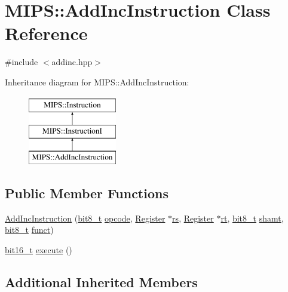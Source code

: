 \hypertarget{classMIPS_1_1AddIncInstruction}{}\section{M\+I\+PS\+:\+:Add\+Inc\+Instruction Class Reference}
\label{classMIPS_1_1AddIncInstruction}


{\ttfamily \#include $<$addinc.\+hpp$>$}

Inheritance diagram for M\+I\+PS\+:\+:Add\+Inc\+Instruction\+:\begin{figure}[H]
\begin{center}
\leavevmode
\includegraphics[height=3.000000cm]{classMIPS_1_1AddIncInstruction}
\end{center}
\end{figure}
\subsection*{Public Member Functions}
\begin{DoxyCompactItemize}
\item 
\hyperlink{classMIPS_1_1AddIncInstruction_a854d632650c4c1177d036fd8a1e85afb}{Add\+Inc\+Instruction} (\hyperlink{core_8hpp_a6074bae122ae7b527864eec42c728c3c}{bit8\+\_\+t} \hyperlink{classMIPS_1_1Instruction_a45cc6808b5dde8a5d41067d148b55476}{opcode}, \hyperlink{classMIPS_1_1Register}{Register} $\ast$\hyperlink{classMIPS_1_1InstructionI_a2be191d5b3dce505e2e626ec02eb4d62}{rs}, \hyperlink{classMIPS_1_1Register}{Register} $\ast$\hyperlink{classMIPS_1_1InstructionI_add1db07a5c954f35271de8c8a5737487}{rt}, \hyperlink{core_8hpp_a6074bae122ae7b527864eec42c728c3c}{bit8\+\_\+t} \hyperlink{classMIPS_1_1InstructionI_aa9b6da37c374c2ec8d96448d341e5e7d}{shamt}, \hyperlink{core_8hpp_a6074bae122ae7b527864eec42c728c3c}{bit8\+\_\+t} \hyperlink{classMIPS_1_1InstructionI_a5c6efcbbd233a7447c1fe24ea0a1e558}{funct})
\item 
\hyperlink{core_8hpp_adc265a970bc35995b5879784bbb3f1b7}{bit16\+\_\+t} \hyperlink{classMIPS_1_1AddIncInstruction_aa63fcaf17a9afc2f1b5d09a6291a70d6}{execute} ()
\end{DoxyCompactItemize}
\subsection*{Additional Inherited Members}


